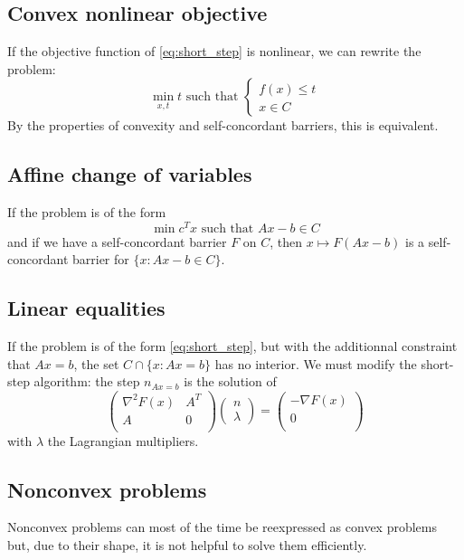\documentclass[12pt, openany]{report}
\theoremstyle{definition}
\begin{document}
\subsection{Convex nonlinear objective}
If the objective function of \eqref{eq:short_step} is nonlinear, we can rewrite the problem:
\begin{equation}
    \min_{x,t}t \text{ such that }\begin{cases}
        f(x)\le t\\
        x\in C
    \end{cases}
\end{equation}
By the properties of convexity and self-concordant barriers, this is equivalent.
\subsection{Affine change of variables}
If the problem is of the form 
\begin{equation}
    \min c^Tx\text{ such that }Ax-b\in C
\end{equation}
and if we have a self-concordant barrier $F$ on $C$, then $x\mapsto F(Ax-b)$ is a self-concordant barrier for $\{x:Ax-b\in C\}$.
\subsection{Linear equalities}
If the problem is of the form \eqref{eq:short_step}, but with the additionnal constraint that $Ax=b$, the set $C\cap \{x:Ax=b\}$ has no interior. We must modify the short-step algorithm: the step $n_{Ax=b}$ is the solution of 
\begin{equation}
    \begin{pmatrix}
        \nabla^2F(x) & A^T\\
        A & 0\\
    \end{pmatrix}\begin{pmatrix}
        n\\ \lambda 
    \end{pmatrix} = \begin{pmatrix}
        -\nabla F(x)\\ 0\\
    \end{pmatrix}
\end{equation}
with $\lambda$ the Lagrangian multipliers.
\subsection{Nonconvex problems}
Nonconvex problems can most of the time be reexpressed as convex problems but, due to their shape, it is not helpful to solve them efficiently.\\
\end{document}
